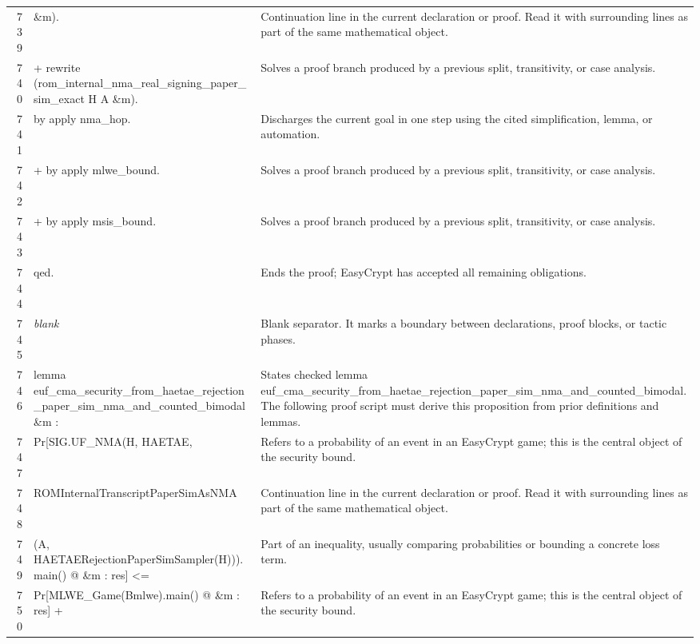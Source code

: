 \documentclass[10pt]{article}
\begin{document}
\begin{longtable}{r L{0.53\textwidth} L{0.37\textwidth}}
739 & {\ttfamily\scriptsize          \&m).} & Continuation line in the current declaration or proof.  Read it with surrounding lines as part of the same mathematical object. \\
740 & {\ttfamily\scriptsize + rewrite (rom\_internal\_nma\_real\_signing\_paper\_sim\_exact H A \&m).} & Solves a proof branch produced by a previous split, transitivity, or case analysis. \\
741 & {\ttfamily\scriptsize   by apply nma\_hop.} & Discharges the current goal in one step using the cited simplification, lemma, or automation. \\
742 & {\ttfamily\scriptsize + by apply mlwe\_bound.} & Solves a proof branch produced by a previous split, transitivity, or case analysis. \\
743 & {\ttfamily\scriptsize + by apply msis\_bound.} & Solves a proof branch produced by a previous split, transitivity, or case analysis. \\
744 & {\ttfamily\scriptsize qed.} & Ends the proof; EasyCrypt has accepted all remaining obligations. \\
745 & {\ttfamily\scriptsize \emph{blank}} & Blank separator.  It marks a boundary between declarations, proof blocks, or tactic phases. \\
746 & {\ttfamily\scriptsize lemma euf\_cma\_security\_from\_haetae\_rejection\_paper\_sim\_nma\_and\_counted\_bimodal \&m :} & States checked lemma euf\_cma\_security\_from\_haetae\_rejection\_paper\_sim\_nma\_and\_counted\_bimodal.  The following proof script must derive this proposition from prior definitions and lemmas. \\
747 & {\ttfamily\scriptsize   Pr[SIG.UF\_NMA(H, HAETAE,} & Refers to a probability of an event in an EasyCrypt game; this is the central object of the security bound. \\
748 & {\ttfamily\scriptsize        ROMInternalTranscriptPaperSimAsNMA} & Continuation line in the current declaration or proof.  Read it with surrounding lines as part of the same mathematical object. \\
749 & {\ttfamily\scriptsize          (A, HAETAERejectionPaperSimSampler(H))).main() @ \&m : res] <=} & Part of an inequality, usually comparing probabilities or bounding a concrete loss term. \\
750 & {\ttfamily\scriptsize     Pr[MLWE\_Game(Bmlwe).main() @ \&m : res] +} & Refers to a probability of an event in an EasyCrypt game; this is the central object of the security bound. \\

\end{longtable}
\end{document}
